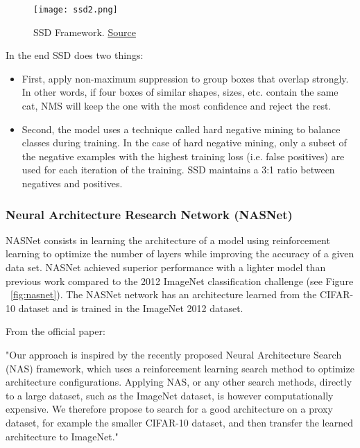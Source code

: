 \begin{figure}[H]
    \centering
    \texttt{[image: ssd2.png]}
	\caption[SSD2]{SSD Framework. \href{https://arxiv.org/pdf/1512.02325.pdf}{Source}}
	\label{fig:ssdinf}
\end{figure}

In the end SSD does two things:
\begin{itemize}
    \item First, apply non-maximum suppression to group boxes that overlap strongly. In other words, if four boxes of similar shapes, sizes, etc. contain the same cat, NMS will keep the one with the most confidence and reject the rest. 
    \item Second, the model uses a technique called hard negative mining to balance classes during training. In the case of hard negative mining, only a subset of the negative examples with the highest training loss (i.e. false positives) are used for each iteration of the training. SSD maintains a 3:1 ratio between negatives and positives.
\end{itemize}

\pagebreak\subsubsection{Neural Architecture Research Network (NASNet)}

NASNet\cite{nasnet} consists in learning the architecture of a model using reinforcement learning to optimize the number of layers while improving the accuracy of a given data set. NASNet achieved superior performance with a lighter model than previous work compared to the 2012 ImageNet classification challenge (see Figure ~\ref{fig:nasnet}).
The NASNet network has an architecture learned from the CIFAR-10\cite{cifar10} dataset and is trained in the ImageNet 2012 dataset.

From the official paper:

\begin{it}
"Our approach is inspired by the recently proposed Neural Architecture Search (NAS) framework, which uses a reinforcement learning search method to optimize architecture configurations. Applying NAS, or any other search methods, directly to a large dataset, such as the ImageNet dataset, is however computationally expensive. We therefore propose to search for a good architecture on a proxy dataset, for example the smaller CIFAR-10 dataset, and then transfer the learned architecture to ImageNet."
\end{it}

